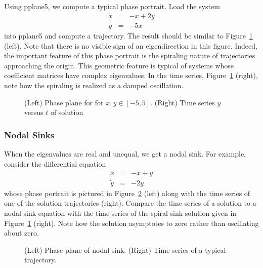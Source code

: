\documentclass{ximera}
\begin{document}
Using {\sf pplane5}, we compute a typical
phase portrait.  Load the system
\begin{equation} \label{e:complex2}
\begin{array}{rcl}
\dot{x} & = & -x + 2y \\
\dot{y} & = & -5x
\end{array}
\end{equation}
into {\sf pplane5} and compute a trajectory.  The result should
be similar to Figure~\ref{rotfig} (left).  Note that there is no
visible sign of an eigendirection in this figure.
Indeed, the important feature of this phase portrait is the spiraling
nature of trajectories approaching the origin.  This geometric feature
is typical of systems whose coefficient matrices have complex
eigenvalues.  In the time series, Figure~\ref{rotfig} (right),
note how the spiraling is realized as a damped oscillation.

\begin{figure}[htb]
        \centerline{%
        }
        \caption{(Left) Phase plane for \protect{}
              for $x,y\in [-5,5]$.  (Right) Time series $y$ versus $t$
	      of solution}
        \label{rotfig}
\end{figure}




\subsubsection*{Nodal Sinks}

When the eigenvalues are real and unequal, we get a nodal sink.
For example, consider the differential equation
\begin{eqnarray*}
\dot{x} & = & -x+y \\
\dot{y} & = & -2y
\end{eqnarray*}
whose phase portrait is pictured
in Figure~\ref{F:nodalsink} (left)
along with the time series of one of the solution trajectories (right).
Compare the time series of a solution to a nodal sink equation
with the time series of the spiral sink solution given in
Figure~\ref{rotfig} (right).  Note how the solution asymptotes
to zero rather than oscillating about zero.

\begin{figure}[htb]
           \centerline{%
           }
           \caption{(Left) Phase plane of nodal sink.
	(Right) Time series of a typical trajectory.}
           \label{F:nodalsink}
\end{figure}
\end{document}
